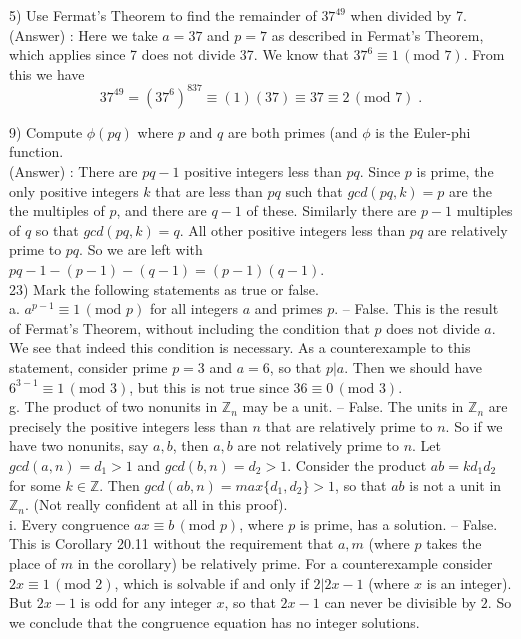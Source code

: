 \documentclass[12pt, letterpaper]{article}
\begin{document}
5) Use Fermat's Theorem to find the remainder of $37^{49}$ when divided by 7. \\

(Answer) : Here we take $a = 37$ and $p = 7$ as described in Fermat's Theorem, which applies since 7 does not divide 37. We know that $37^6 \equiv 1 \, (\mbox{mod } 7)$. From this we have $$37^{49} = (37^6)^837 \equiv (1)(37) \equiv 37 \equiv 2 \, (\mbox{mod } 7)\;.$$ 

9) Compute $\phi(pq)$ where $p$ and $q$ are both primes (and $\phi$ is the Euler-phi function. \\

(Answer) : There are $pq - 1$ positive integers less than $pq$. Since $p$ is prime, the only positive integers $k$ that are less than $pq$ such that $gcd(pq,k) = p$ are the the multiples of $p$, and there are $q-1$ of these. Similarly there are $p-1$ multiples of $q$ so that $gcd(pq,k) = q$. All other positive integers less than $pq$ are relatively prime to $pq$. So we are left with $pq - 1 - (p-1) - (q-1) = (p-1)(q-1)$. \\

23) Mark the following statements as true or false. \\

a. $a^{p-1} \equiv 1 \, (\mbox{mod } p)$ for all integers $a$ and primes $p$. -- False. This is the result of Fermat's Theorem, without including the condition that $p$ does not divide $a$. We see that indeed this condition is necessary. As a counterexample to this statement, consider prime $p = 3$ and $a = 6$, so that $p | a$. Then we should have $6^{3-1} \equiv 1 \, (\mbox{mod } 3)$, but this is not true since $36 \equiv 0 \, (\mbox{mod } 3)$. \\

g. The product of two nonunits in $\mathbb{Z}_n$ may be a unit. -- False. The units in $\mathbb{Z}_n$ are precisely the positive integers less than $n$ that are relatively prime to $n$. So if we have two nonunits, say $a,b$, then $a,b$ are not relatively prime to $n$. Let $gcd(a,n) = d_1 > 1$ and $gcd(b,n) = d_2 >1$. Consider the product $ab = kd_1d_2$ for some $k \in \mathbb{Z}$. Then $gcd(ab,n) = max \{d_1,d_2\} > 1$, so that $ab$ is not a unit in $\mathbb{Z}_n$. (Not really confident at all in this proof). \\

i. Every congruence $ax \equiv b \, (\mbox{mod } p)$, where $p$ is prime, has a solution. -- False. This is Corollary 20.11 without the requirement that $a,m$ (where $p$ takes the place of $m$ in the corollary) be relatively prime. For a counterexample consider $2x \equiv 1 \, (\mbox{mod } 2)$, which is solvable if and only if $2 | 2x - 1$ (where $x$ is an integer). But $2x - 1$ is odd for any integer $x$, so that $2x - 1$ can never be divisible by $2$. So we conclude that the congruence equation has no integer solutions. \\
\end{document}
